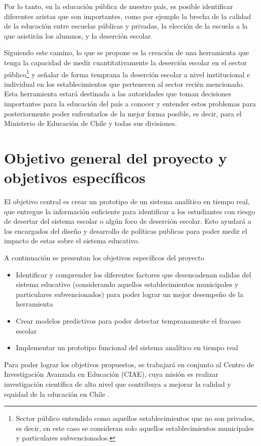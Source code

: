 \begin{description}
Por lo tanto, en la educación pública de nuestro país, es posible identificar diferentes aristas que son importantes, como por ejemplo la brecha de la calidad de la educación entre escuelas públicas y privadas, la elección de la escuela a la que asistirán los alumnos, y la deserción escolar.

Siguiendo este camino, lo que se propone es la creación de una herramienta que tenga la capacidad de medir cuantitativamente la deserción escolar en el sector público\footnote{Sector público entendido como aquellos establecimientos que no son privados, es decir, en este caso se consideran solo aquellos establecimientos municipales y particulares subvencionados.} y señalar de forma temprana la deserción escolar a nivel institucional e individual en los establecimientos que pertenecen al sector recién mencionado.
Esta herramienta estará destinada a las autoridades que toman decisiones importantes para la educación del país a conocer y entender estos problemas para posteriormente poder enfrentarlos de la mejor forma posible, es decir, para el Ministerio de Educación de Chile y todas sus divisiones. 

\section{Objetivo general del proyecto y objetivos específicos}
El objetivo central es crear un prototipo de un sistema analítico en tiempo real, que entregue la información suficiente para identificar a los estudiantes con riesgo de desertar del sistema escolar o algún foco de deserción escolar. Esto ayudará a los encargados del diseño y desarrollo de políticas publicas para poder medir el impacto de estas sobre el sistema educativo.

A continuación se presentan los objetivos específicos del proyecto
\begin{itemize}
\item Identificar y comprender los diferentes factores que desencadenan salidas del sistema educativo (considerando aquellos establecimientos municipales y particulares subvencionados) para poder lograr un mejor desempeño de la herramienta
\item Crear modelos predictivos para poder detectar tempranamente el fracaso escolar
\item Implementar un prototipo funcional del sistema analítico en tiempo real
\end{itemize}

Para poder lograr los objetivos propuestos, se trabajará en conjunto al Centro de Investigación Avanzada en Educación (CIAE), cuya misión es realizar investigación científica de alto nivel que contribuya a mejorar la calidad y equidad de la educación en Chile \cite{ciae}.


\end{description}
